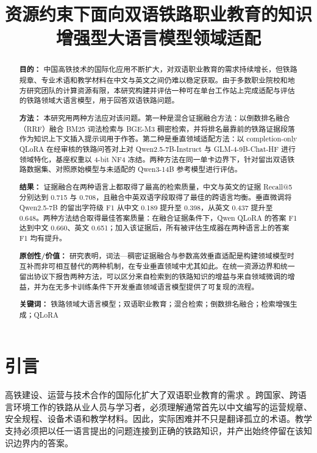 \documentclass{article}
\title{资源约束下面向双语铁路职业教育的知识增强型大语言模型领域适配}
\author{}
\date{}
\begin{document}
\maketitle

\begin{abstract}

\textbf{目的：} 中国高铁技术的国际化应用不断扩大，对双语职业教育的需求持续增长，但铁路规章、专业术语和教学材料在中文与英文之间仍难以稳定获取。由于多数职业院校和地方研究团队的计算资源有限，本研究构建并评估一种可在单台工作站上完成适配与评估的铁路领域大语言模型，用于回答双语铁路问题。

\textbf{方法：} 本研究用两种方法应对该问题。第一种是混合证据融合方法：以倒数排名融合（RRF）融合 BM25 词法检索与 BGE-M3 稠密检索，并将排名最靠前的铁路证据段落作为知识上下文插入提示词用于作答。第二种是垂直领域适配方法：以 completion-only QLoRA 在经审核的铁路问答对上对 Qwen2.5-7B-Instruct 与 GLM-4-9B-Chat-HF 进行领域特化，基座权重以 4-bit NF4 冻结。两种方法在同一单卡边界下，针对留出双语铁路数据集、对照原始模型与未适配的 Qwen3-14B 参考模型进行评估。

\textbf{结果：} 证据融合在两种语言上都取得了最高的检索质量，中文与英文的证据 Recall@5 分别达到 0.715 与 0.708，且融合中英双语字段取得了最佳的跨语言均衡。垂直微调将 Qwen2.5-7B 的留出字符级 F1 从中文 0.189 提升至 0.398，从英文 0.437 提升至 0.648。两种方法结合取得最佳答案质量：在融合证据条件下，Qwen QLoRA 的答案 F1 达到中文 0.660、英文 0.651；加入该证据后，所有被评估生成器在两种语言上的答案 F1 均有提升。

\textbf{原创性/价值：} 研究表明，词法—稠密证据融合与参数高效垂直适配是构建领域模型时互补而非可相互替代的两种机制，在专业垂直领域中尤其如此。在统一资源边界和统一留出协议下报告两种方法，可以区分来自检索到的铁路知识的增益与来自领域微调的增益，并为在无多卡训练条件下开发垂直领域语言模型提供了可复现的流程。

\textbf{关键词：} 铁路领域大语言模型；双语职业教育；混合检索；倒数排名融合；检索增强生成；QLoRA

\end{abstract}

\section{引言}

高铁建设、运营与技术合作的国际化扩大了双语职业教育的需求 \citep{lawrence2019hsr,xu2018education}。跨国家、跨语言环境工作的铁路从业人员与学习者，必须理解通常首先以中文编写的运营规章、安全规程、设备术语和教学材料。因此，实际困难并不只是翻译孤立的术语。教学支持必须把以任一语言提出的问题连接到正确的铁路知识，并产出始终停留在该知识边界内的答案。
\end{document}
